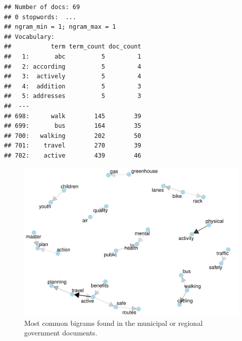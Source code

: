 \documentclass[]{elsarticle} %
\begin{document}
\begin{verbatim}
## Number of docs: 69 
## 0 stopwords:  ... 
## ngram_min = 1; ngram_max = 1 
## Vocabulary: 
##           term term_count doc_count
##   1:       abc          5         1
##   2: according          5         4
##   3:  actively          5         4
##   4:  addition          5         3
##   5: addresses          5         3
##  ---                               
## 698:      walk        145        39
## 699:       bus        164        35
## 700:   walking        202        50
## 701:    travel        270        39
## 702:    active        439        46
\end{verbatim}

\begin{figure}

{\centering \includegraphics[width=1\linewidth]{AST-Framing-Ontario_files/figure-latex/city-visual-1} 

}

\caption{Most common bigrams found in the municipal or regional government documents.}\label{fig:city-visual}
\end{figure}
\end{document}

